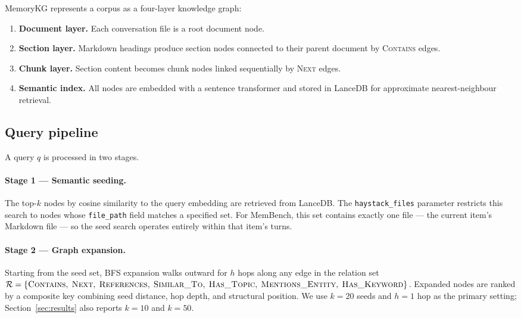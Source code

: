 \documentclass[11pt,a4paper]{article}
\begin{document}
MemoryKG represents a corpus as a four-layer knowledge graph:

\begin{enumerate}
  \item \textbf{Document layer.} Each conversation file is a root document node.
  \item \textbf{Section layer.} Markdown headings produce section nodes
        connected to their parent document by \textsc{Contains} edges.
  \item \textbf{Chunk layer.} Section content becomes chunk nodes linked
        sequentially by \textsc{Next} edges.
  \item \textbf{Semantic index.} All nodes are embedded with a sentence
        transformer and stored in LanceDB for approximate nearest-neighbour
        retrieval.
\end{enumerate}

\subsection{Query pipeline}

A query $q$ is processed in two stages.

\paragraph{Stage 1 --- Semantic seeding.}
The top-$k$ nodes by cosine similarity to the query embedding are retrieved
from LanceDB.
The \texttt{haystack\_files} parameter restricts this search to nodes whose
\texttt{file\_path} field matches a specified set.
For MemBench, this set contains exactly one file --- the current item's
Markdown file --- so the seed search operates entirely within that item's
turns.

\paragraph{Stage 2 --- Graph expansion.}
Starting from the seed set, BFS expansion walks outward for $h$ hops along
any edge in the relation set
$\mathcal{R} = \{\textsc{Contains},\;\textsc{Next},\;\textsc{References},\;
\textsc{Similar\_To},\;\textsc{Has\_Topic},\;\textsc{Mentions\_Entity},\;
\textsc{Has\_Keyword}\}$.
Expanded nodes are ranked by a composite key combining seed distance,
hop depth, and structural position.
We use $k{=}20$ seeds and $h{=}1$ hop as the primary setting; Section~\ref{sec:results} also reports $k{=}10$ and $k{=}50$.
\end{document}
